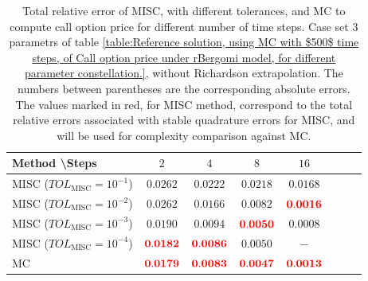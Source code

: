 \FloatBarrier


\begin{table}[h!]
	\centering
	\begin{tabular}{l*{6}{c}r}
		Method \textbackslash  Steps            & $2$ & $4$ & $8$ & $16$  \\
		\hline
		MISC ($TOL_{\text{MISC}}=10^{-1}$)  &  $\mathbf{0.0262}$ & $\mathbf{0.0222}$& $\mathbf{ 0.0218}$ & $\mathbf{ 0.0168}$   \\
		MISC ($TOL_{\text{MISC}}=10^{-2}$)  &  $\mathbf{0.0262}$ & $\mathbf{0.0166}$& $\mathbf{ 0.0082}$ & $\mathbf{ {\color{red}0.0016}}$  \\
		MISC ($TOL_{\text{MISC}}=10^{-3}$)  &  $\mathbf{0.0190}$ & $\mathbf{0.0094}$& $\mathbf{{\color{red}0.0050}}$  & $\mathbf{ 0.0008}$  \\
		MISC ($TOL_{\text{MISC}}=10^{-4}$)  &  $\mathbf{{\color{red}0.0182}}$ & $\mathbf{{\color{red}0.0086}}$& $\mathbf{0.0050}$ & $\mathbf{ -}$ \\
		\hline
		MC    & $\mathbf{{\color{red}0.0179}}$  & $\mathbf{ {\color{red}0.0083}}$  & $\mathbf{{\color{red}0.0047}}$ & $\mathbf{ {\color{red}0.0013}}$  \\		
		\hline
	\end{tabular}
	\caption{Total relative error of MISC, with different tolerances, and MC to compute call option price for different number of time steps. Case set $3$ parametrs of table \ref{table:Reference solution, using MC with $500$ time steps, of Call option price under rBergomi model, for different parameter constellation.}, without Richardson extrapolation. The numbers between parentheses are the corresponding absolute errors. The values marked in red, for MISC method, correspond to the total relative errors associated with  stable quadrature errors for MISC, and will be used for complexity comparison against MC.}
	\label{Total error of MISC and MC to compute Call option price of the different tolerances for different number of time steps. Case set 3, without Richardson extrapolation. The numbers between parentheses are the corresponding absolute errors.}
\end{table}


